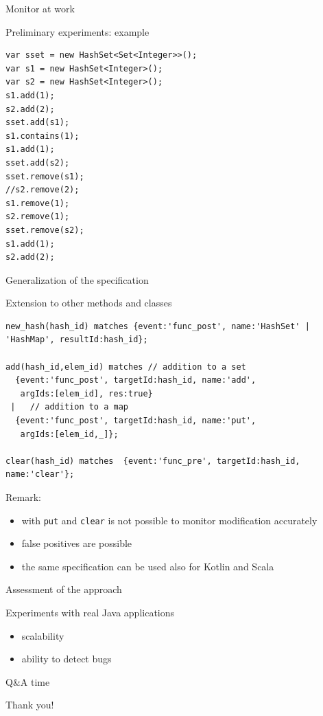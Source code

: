 \documentclass[10pt,usenames,dvipsnames]{beamer}
\begin{document}

\begin{frame}[fragile]{Monitor at work}
  \begin{block}{Preliminary experiments: example}
    \begin{lstlisting}[basicstyle=\ttfamily\footnotesize]
var sset = new HashSet<Set<Integer>>();
var s1 = new HashSet<Integer>();
var s2 = new HashSet<Integer>();
s1.add(1);
s2.add(2);
sset.add(s1);
s1.contains(1);
s1.add(1);
sset.add(s2);
sset.remove(s1);
//s2.remove(2);
s1.remove(1);
s2.remove(1);
sset.remove(s2);
s1.add(1);
s2.add(2);
    \end{lstlisting}
  \end{block}
\end{frame}


\begin{frame}[fragile]{Generalization of the specification}
  \begin{block}{Extension to other methods and classes}
    \begin{lstlisting}[basicstyle=\ttfamily\footnotesize]
new_hash(hash_id) matches {event:'func_post', name:'HashSet' | 'HashMap', resultId:hash_id};

add(hash_id,elem_id) matches // addition to a set
  {event:'func_post', targetId:hash_id, name:'add',  
   argIds:[elem_id], res:true}
 |   // addition to a map  
  {event:'func_post', targetId:hash_id, name:'put',  
   argIds:[elem_id,_]};

clear(hash_id) matches  {event:'func_pre', targetId:hash_id, name:'clear'}; 
    \end{lstlisting}

  \end{block}
  \alert{Remark:}
  \begin{itemize}
  \item with \lstinline{put} and \lstinline{clear} is not possible to monitor modification accurately
  \item false positives are possible
  \item the same specification can be used also for Kotlin and Scala
  \end{itemize}
  \end{frame}


\begin{frame}[fragile]{Assessment of the approach}
  \begin{block}{Experiments with real Java applications}
    \begin{itemize}
    \item scalability
    \item ability to detect bugs
    \end{itemize}
  \end{block}
  \end{frame}


\begin{frame}{Q\&A time}
\vspace*{16ex}
  \begin{center}
  \LARGE Thank you!
\end{center}
\end{frame}
\end{document}
